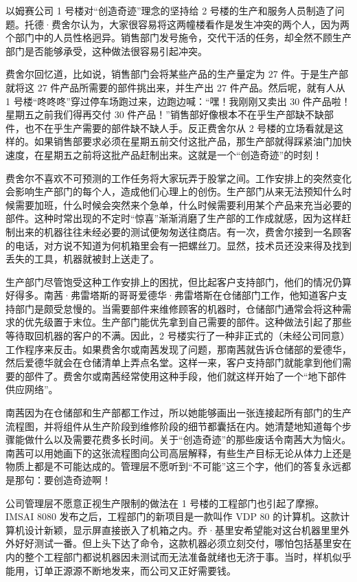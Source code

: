 \documentclass[12pt,UTF8]{ctexbook}
\begin{document}
以姆赛公司 1 号楼对“创造奇迹”理念的坚持给 2 号楼的生产和服务人员制造了问题。托德·费舍尔认为，大家很容易将这两幢楼看作是发生冲突的两个人，因为两个部门中的人员性格迥异。销售部门发号施令，交代干活的任务，却全然不顾生产部门是否能够承受，这种做法很容易引起冲突。

费舍尔回忆道，比如说，销售部门会将某些产品的生产量定为 27 件。于是生产部就将这 27 件产品所需要的部件挑出来，并生产出 27 件产品。然后呢，就有人从 1 号楼“咚咚咚”穿过停车场跑过来，边跑边喊：“嘿！我刚刚又卖出 30 件产品啦！星期五之前我们得再交付 30 件产品！”销售部好像根本不在乎生产部缺不缺部件，也不在乎生产需要的部件缺不缺人手。反正费舍尔从 2 号楼的立场看就是这样的。如果销售部要求必须在星期五前交付这批产品，那生产部就得踩紧油门加快速度，在星期五之前将这批产品赶制出来。这就是一个“创造奇迹”的时刻！

费舍尔不喜欢不可预测的工作任务将大家玩弄于股掌之间。工作安排上的突然变化会影响生产部门的每个人，造成他们心理上的创伤。生产部门从来无法预知什么时候需要加班，什么时候会突然来个急单，什么时候需要利用某个产品来充当必要的部件。这种时常出现的不定时“惊喜”渐渐消磨了生产部的工作成就感，因为这样赶制出来的机器往往未经必要的测试便匆匆送往商店。有一次，费舍尔接到一名顾客的电话，对方说不知道为何机箱里会有一把螺丝刀。显然，技术员还没来得及找到丢失的工具，机器就被封上送走了。

生产部门尽管饱受这种工作安排上的困扰，但比起客户支持部门，他们的情况仍算好得多。南茜·弗雷塔斯的哥哥爱德华·弗雷塔斯在仓储部门工作，他知道客户支持部门是颇受怠慢的。当需要部件来维修顾客的机器时，仓储部门通常会将这种需求的优先级置于末位。生产部门能优先拿到自己需要的部件。这种做法引起了那些等待取回机器的客户的不满。因此，2 号楼实行了一种非正式的（未经公司同意）工作程序来反击。如果费舍尔或南茜发现了问题，那南茜就告诉仓储部的爱德华，然后爱德华就会在仓储清单上弄点名堂。这样一来，客户支持部门就能拿到他们需要的部件了。费舍尔或南茜经常使用这种手段，他们就这样开始了一个“地下部件供应网络”。

南茜因为在仓储部和生产部都工作过，所以她能够画出一张连接起所有部门的生产流程图，并将组件从生产阶段到维修阶段的细节都囊括在内。她清楚地知道每个步骤能做什么以及需要花费多长时间。关于“创造奇迹”的那些废话令南茜大为恼火。南茜可以用她画下的这张流程图向公司高层解释，有些生产目标无论从体力上还是物质上都是不可能达成的。管理层不愿听到“不可能”这三个字，他们的答复永远都是那句：要创造奇迹啊！

公司管理层不愿意正视生产限制的做法在 1 号楼的工程部门也引起了摩擦。IMSAI 8080 发布之后，工程部门的新项目是一款叫作 VDP 80 的计算机。这款计算机设计新颖，显示屏直接嵌入了机箱之内。乔·基里安希望能对这台机器里里外外好好测试一番。但上头下达了命令，这款机器必须立刻交付，哪怕包括基里安在内的整个工程部门都说机器因未测试而无法准备就绪也无济于事。当时，样机似乎能用，订单正源源不断地发来，而公司又正好需要钱。
\end{document}
